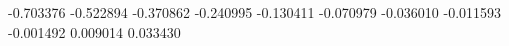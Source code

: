 -0.703376
-0.522894
-0.370862
-0.240995
-0.130411
-0.070979
-0.036010
-0.011593
-0.001492
0.009014
0.033430
